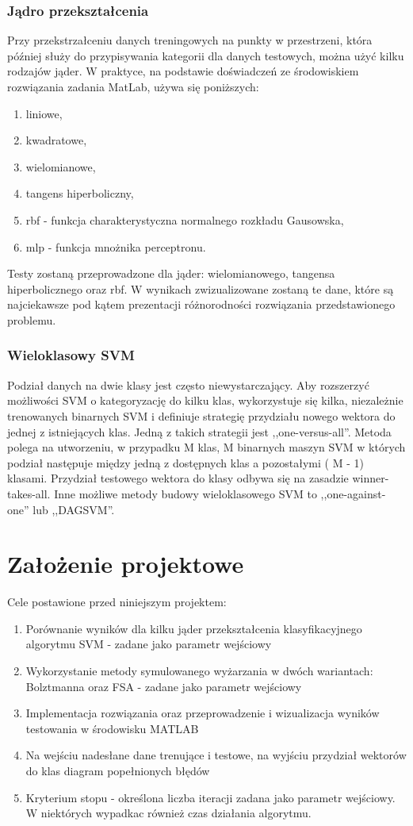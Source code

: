 \documentclass{article}
\begin{document}
\subsubsection{Jądro przekształcenia}
Przy przekstrzałceniu danych treningowych na punkty w przestrzeni, która później służy do przypisywania kategorii dla danych testowych, można użyć kilku rodzajów jąder. W praktyce, na podstawie doświadczeń ze środowiskiem rozwiązania zadania MatLab, używa się poniższych:
\begin{enumerate}
\item liniowe,
\item kwadratowe,
\item wielomianowe,
\item tangens hiperboliczny,
\item rbf - funkcja charakterystyczna normalnego rozkładu Gausowska,
\item mlp - funkcja mnożnika perceptronu.
\end{enumerate}
Testy zostaną przeprowadzone dla jąder: wielomianowego, tangensa hiperbolicznego oraz rbf. W wynikach zwizualizowane zostaną te dane, które są najciekawsze pod kątem prezentacji różnorodności rozwiązania przedstawionego problemu.
\subsubsection{Wieloklasowy SVM}
Podział danych na dwie klasy jest często niewystarczający. Aby rozszerzyć możliwości SVM o kategoryzację do kilku klas, wykorzystuje się kilka, niezależnie trenowanych binarnych SVM i definiuje strategię przydziału nowego wektora do jednej z istniejących klas. Jedną z takich strategii jest ,,one-versus-all''. Metoda polega na utworzeniu, w przypadku M klas, M binarnych maszyn SVM w których podział następuje między jedną z dostępnych klas a pozostałymi ( M - 1) klasami. Przydział testowego wektora do klasy odbywa się na zasadzie winner-takes-all.
Inne możliwe metody budowy wieloklasowego SVM to ,,one-against-one'' lub ,,DAGSVM''.
 
\pagebreak
\section{Założenie projektowe}
Cele postawione przed niniejszym projektem:
\begin{enumerate}
\item Porównanie wyników dla kilku jąder przekształcenia klasyfikacyjnego algorytmu SVM - zadane jako parametr wejściowy
\item Wykorzystanie metody symulowanego wyżarzania w dwóch wariantach: Bolztmanna oraz FSA - zadane jako parametr wejściowy
\item Implementacja rozwiązania oraz przeprowadzenie i wizualizacja wyników testowania w środowisku MATLAB
\item Na wejściu nadesłane dane trenujące i testowe, na wyjściu przydział wektorów do klas diagram popełnionych błędów
\item Kryterium stopu - określona liczba iteracji zadana jako parametr wejściowy. W niektórych wypadkac również czas działania algorytmu.
\end{enumerate}
\end{document}
